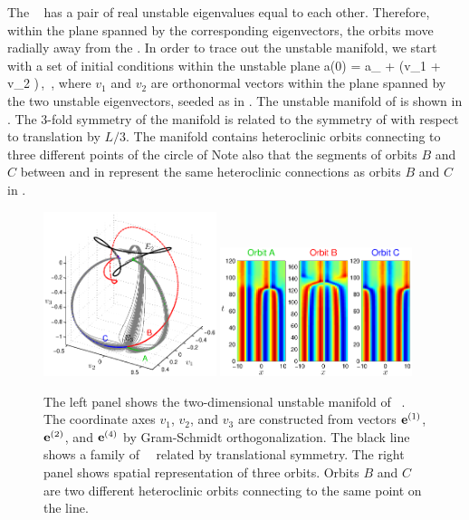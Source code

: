 The \eqv\  has a pair of real unstable eigenvalues
equal to each other.  Therefore, within the plane spanned by the
corresponding eigenvectors, the orbits move radially away from
the \eqv.  In order to trace out the unstable manifold,
we start with a set of initial conditions within the unstable plane
\beq
 a(0) = a_{{}} + \epsilon(v_1 \cos \phi + v_2 \sin \phi)\,,
  \quad\phi\in[0,2\pi]\,,
\label{unsManSeed}
\eeq
where $v_1$ and $v_2$ are orthonormal vectors within the
plane spanned by the two unstable eigenvectors, seeded as in
.
  The unstable manifold
of  is shown in .  The 3-fold symmetry of
the manifold is related to the symmetry of  with respect to
translation by $L/3$.  The manifold contains heteroclinic orbits
connecting  to three different points of the circle of {\eqva}
Note also that the segments of orbits $B$ and $C$
between  and  in 
represent the same heteroclinic connections as orbits $B$ and $C$ in
.

\begin{figure}[t]
\begin{center}
\includegraphics[width=0.45\textwidth]{figs/ks22_E3_manifold.eps}
\includegraphics[width=0.5\textwidth]{figs/ks22_E3_orbits_c.eps}
\end{center}
\caption{
The left panel shows the two-dimensional
unstable manifold of \eqv\ . The coordinate axes
$v_1$, $v_2$, and $v_3$ are constructed from vectors
${\mathbf e}^{(1)}$, ${\mathbf e}^{(2)}$, and ${\mathbf e}^{(4)}$ by Gram-Schmidt orthogonalization.
The black line shows a family of ~\eqva\ related by translational
symmetry. The right panel shows spatial representation of
three orbits. Orbits $B$ and $C$ are two different heteroclinic orbits
connecting  to the same point on the  line.
        }
\label{f:KS22E3man}
\end{figure}

